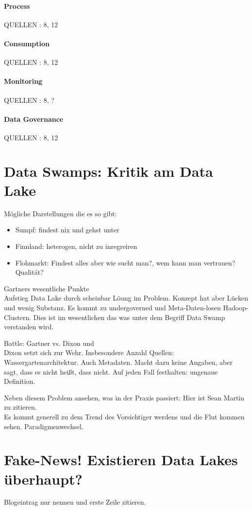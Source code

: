 \documentclass[twoside,twocolumn]{article}
\begin{document}
\paragraph{Process}
QUELLEN : 8, 12
\paragraph{Consumption}
QUELLEN : 8, 12
\paragraph{Monitoring}
QUELLEN : 8, ?
\paragraph{Data Governance}
QUELLEN : 8, 12


\section{Data Swamps: Kritik am Data Lake}
Mögliche Darstellungen die es so gibt:
\begin{itemize}
	\item Sumpf: findest nix und gehst unter \cite{src3}
	\item Finnland: heterogen, nicht zu inregreiren \cite{src13}
	\item Flohmarkt: Findest alles aber wie sucht man?, wem kann man vertrauen? Qualität? \cite{src12}
\end{itemize}

Gartners wesentliche Punkte\\
Aufstieg Data Lake durch scheinbar Löung im Problem. Konzept hat aber Lücken und wenig Substanz. Es kommt zu undergoverned und Meta-Daten-losen Hadoop-Clustern. Dies ist im wesentlichen das was unter dem Begriff Data Swamp verstanden wird.\cite{src3}

Battle: Gartner vs. Dixon und \\
Dixon setzt sich zur Wehr. Insbesondere Anzahl Quellen: Wassergartenarchitektur.\cite{src15} Auch Metadaten. Macht dazu keine Angaben, aber sagt, dass es nicht heißt, dass nicht.\cite{src14} Auf jeden Fall festhalten: ungenaue Definition.\

Neben diesem Problem ansehen, was in der Praxis passiert: Hier ist Sean Martin zu zitieren.\\
Es kommt generell zu dem Trend des Vorsichtiger werdens und die Flut kommen sehen. Paradigmenwechsel.\cite{src1}

\section{Fake-News! Existieren Data Lakes überhaupt?}
Blogeintrag nur nennen und erste Zeile zitieren.\cite{src4}\\
\end{document}

